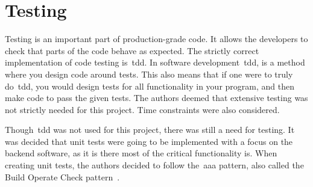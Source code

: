 \section{Testing}\label{sec:testing}

Testing is an important part of production-grade code.
It allows the developers to check that parts of the code behave as expected.
The strictly correct implementation of code testing is~\acrfull{tdd}.
In software development~\acrshort{tdd}, is a method where you design code around tests.
This also means that if one were to truly do~\acrshort{tdd}, you would design tests for all functionality
in your program, and then make code to pass the given tests.
The authors deemed that extensive testing was not strictly needed for this project.
Time constraints were also considered.

Though~\acrshort{tdd} was not used for this project, there was still a need for testing.
It was decided that unit tests were going to be implemented with a focus on the backend software, as
it is there most of the critical functionality is.
When creating unit tests, the authors decided to follow the~\acrfull{aaa} pattern, also called the Build Operate
Check pattern~\cite{clean-code}.




